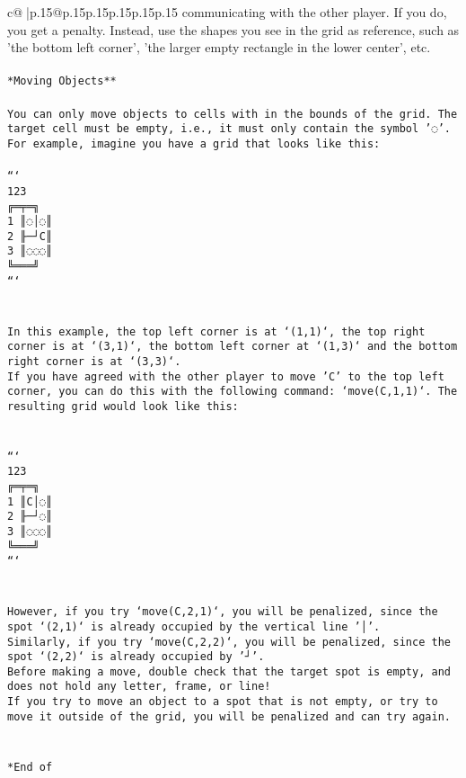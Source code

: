 \documentclass{article}
\begin{document}
{\begin{supertabular}{c@{$\;$}|p{.15\linewidth}@{}p{.15\linewidth}p{.15\linewidth}p{.15\linewidth}p{.15\linewidth}p{.15\linewidth}}
{{{communicating with the other player. If you do, you get a penalty. Instead, use the shapes you see in the grid as reference, such as 'the bottom left corner', 'the larger empty rectangle in the lower center', etc.\\ \tt \\ \tt **Moving Objects**\\ \tt \\ \tt * You can only move objects to cells with in the bounds of the grid. The target cell must be empty, i.e., it must only contain the symbol '◌'.\\ \tt * For example, imagine you have a grid that looks like this: \\ \tt \\ \tt ```\\ \tt     123\\ \tt    ╔═╤═╗\\ \tt  1 ║◌│◌║\\ \tt  2 ╟─┘C║\\ \tt  3 ║◌◌◌║\\ \tt    ╚═══╝\\ \tt ```\\ \tt \\ \tt \\ \tt * In this example, the top left corner is at `(1,1)`, the top right corner is at `(3,1)`, the bottom left corner at `(1,3)` and the bottom right corner is at `(3,3)`.\\ \tt * If you have agreed with the other player to move 'C' to the top left corner, you can do this with the following command: `move(C,1,1)`. The resulting grid would look like this: \\ \tt \\ \tt \\ \tt ```\\ \tt     123\\ \tt    ╔═╤═╗\\ \tt  1 ║C│◌║\\ \tt  2 ╟─┘◌║\\ \tt  3 ║◌◌◌║\\ \tt    ╚═══╝\\ \tt ```\\ \tt \\ \tt \\ \tt * However, if you try `move(C,2,1)`, you will be penalized, since the spot `(2,1)` is already occupied by the vertical line '│'.\\ \tt * Similarly, if you try `move(C,2,2)`, you will be penalized, since the spot `(2,2)` is already occupied by '┘'.\\ \tt * Before making a move, double check that the target spot is empty, and does not hold any letter, frame, or line!\\ \tt * If you try to move an object to a spot that is not empty, or try to move it outside of the grid, you will be penalized and can try again.\\ \tt \\ \tt \\ \tt **End of }}}
\end{supertabular}}
\end{document}
